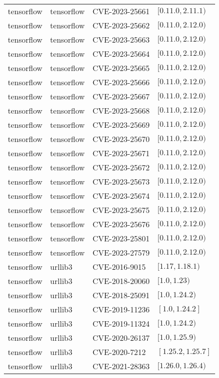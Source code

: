 \begin{tabular}{llll}
tensorflow & tensorflow & CVE-2023-25661 & $[0.11.0,2.11.1)$ \\
tensorflow & tensorflow & CVE-2023-25662 & $[0.11.0,2.12.0)$ \\
tensorflow & tensorflow & CVE-2023-25663 & $[0.11.0,2.12.0)$ \\
tensorflow & tensorflow & CVE-2023-25664 & $[0.11.0,2.12.0)$ \\
tensorflow & tensorflow & CVE-2023-25665 & $[0.11.0,2.12.0)$ \\
tensorflow & tensorflow & CVE-2023-25666 & $[0.11.0,2.12.0)$ \\
tensorflow & tensorflow & CVE-2023-25667 & $[0.11.0,2.12.0)$ \\
tensorflow & tensorflow & CVE-2023-25668 & $[0.11.0,2.12.0)$ \\
tensorflow & tensorflow & CVE-2023-25669 & $[0.11.0,2.12.0)$ \\
tensorflow & tensorflow & CVE-2023-25670 & $[0.11.0,2.12.0)$ \\
tensorflow & tensorflow & CVE-2023-25671 & $[0.11.0,2.12.0)$ \\
tensorflow & tensorflow & CVE-2023-25672 & $[0.11.0,2.12.0)$ \\
tensorflow & tensorflow & CVE-2023-25673 & $[0.11.0,2.12.0)$ \\
tensorflow & tensorflow & CVE-2023-25674 & $[0.11.0,2.12.0)$ \\
tensorflow & tensorflow & CVE-2023-25675 & $[0.11.0,2.12.0)$ \\
tensorflow & tensorflow & CVE-2023-25676 & $[0.11.0,2.12.0)$ \\
tensorflow & tensorflow & CVE-2023-25801 & $[0.11.0,2.12.0)$ \\
tensorflow & tensorflow & CVE-2023-27579 & $[0.11.0,2.12.0)$ \\
tensorflow & urllib3 & CVE-2016-9015 & $[1.17,1.18.1)$ \\
tensorflow & urllib3 & CVE-2018-20060 & $[1.0,1.23)$ \\
tensorflow & urllib3 & CVE-2018-25091 & $[1.0,1.24.2)$ \\
tensorflow & urllib3 & CVE-2019-11236 & $[1.0,1.24.2]$ \\
tensorflow & urllib3 & CVE-2019-11324 & $[1.0,1.24.2)$ \\
tensorflow & urllib3 & CVE-2020-26137 & $[1.0,1.25.9)$ \\
tensorflow & urllib3 & CVE-2020-7212 & $[1.25.2,1.25.7]$ \\
tensorflow & urllib3 & CVE-2021-28363 & $[1.26.0,1.26.4)$ \\

\end{tabular}
